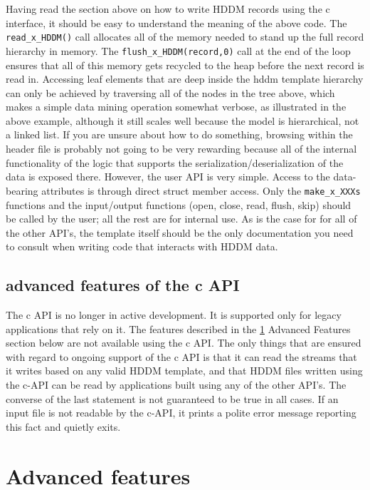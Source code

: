 \documentclass{revtex4}
\begin{document}
Having read the section above on how to write HDDM records using the c
interface, it should be easy to understand the meaning of the above code.
The \texttt{read\_x\_HDDM()} call allocates all of the memory needed to
stand up the full record hierarchy in memory. The \texttt{flush\_x\_HDDM(record,0)}
call at the end of the loop ensures that all of this memory gets recycled
to the heap before the next record is read in. Accessing leaf elements that
are deep inside the hddm template hierarchy can only be achieved by traversing
all of the nodes in the tree above, which makes a simple data mining operation
somewhat verbose, as illustrated in the above example, although it still scales
well because the model is hierarchical, not a linked list. If you are unsure
about how to do something, browsing within the header file is probably not
going to be very rewarding because all of the internal functionality of the
logic that supports the serialization/deserialization of the data is exposed
there. However, the user API is very simple. Access to the data-bearing attributes
is through direct struct member access. Only the \texttt{make\_x\_XXXs} functions
and the input/output functions (open, close, read, flush, skip) should be called
by the user; all the rest are for internal use. As is the case for for all of the
other API's, the template itself should be the only documentation
you need to consult when writing code that interacts with HDDM data.

\subsection{advanced features of the c API}

The c API is no longer in active development. It is supported only for legacy
applications that rely on it. The features described in the \ref{Advanced_features}
{Advanced Features} section below are not available using the c API. The only things
that are ensured with regard to ongoing support of the c API is that it can read
the streams that it writes based on any valid HDDM template, and that HDDM files
written using the c-API can be read by applications built using any of the other
API's. The converse of the last statement is not guaranteed to
be true in all cases. If an input file is not readable by the c-{}API, it prints
a polite error message reporting this fact and quietly exits.

\section{Advanced features}\label{Advanced_features}
\end{document}

